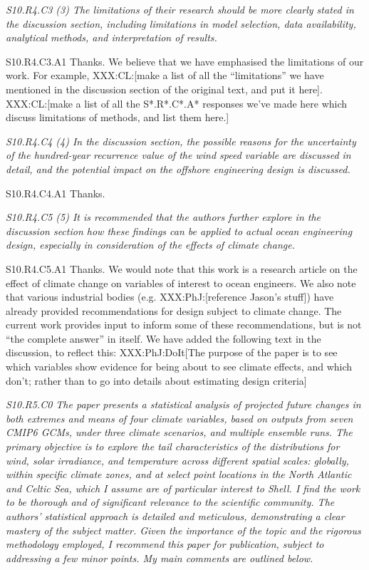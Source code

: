 \documentclass[a4paper,10pt]{article}
\begin{document}
	\emph{S10.R4.C3 (3) The limitations of their research should be more clearly stated in the discussion section, including limitations in model selection, data availability, analytical methods, and interpretation of results.}

	S10.R4.C3.A1 Thanks. We believe that we have emphasised the limitations of our work. For example, XXX:CL:[make a list of all the ``limitations'' we have mentioned in the discussion section of the original text, and put it here]. XXX:CL:[make a list of all the S*.R*.C*.A* responses we've made here which discuss limitations of methods, and list them here.]

	\emph{S10.R4.C4 (4) In the discussion section, the possible reasons for the uncertainty of the hundred-year recurrence value of the wind speed variable are discussed in detail, and the potential impact on the offshore engineering design is discussed.}

	S10.R4.C4.A1 Thanks.

	\emph{S10.R4.C5 (5) It is recommended that the authors further explore in the discussion section how these findings can be applied to actual ocean engineering design, especially in consideration of the effects of climate change.}

	S10.R4.C5.A1 Thanks. We would note that this work is a research article on the effect of climate change on variables of interest to ocean engineers. We also note that various industrial bodies (e.g. XXX:PhJ:[reference Jason's stuff]) have already provided recommendations for design subject to climate change. The current work provides input to inform some of these recommendations, but is not ``the complete answer'' in itself. We have added the following text in the discussion, to reflect this: XXX:PhJ:DoIt[The purpose of the paper is to see which variables show evidence for being about to see climate effects, and which don't; rather than to go into details about estimating design criteria]

	\emph{S10.R5.C0 The paper presents a statistical analysis of projected future changes in both extremes and means of four climate variables, based on outputs from seven CMIP6 GCMs, under three climate scenarios, and multiple ensemble runs. The primary objective is to explore the tail characteristics of the distributions for wind, solar irradiance, and temperature across different spatial scales: globally, within specific climate zones, and at select point locations in the North Atlantic and Celtic Sea, which I assume are of particular interest to Shell. I find the work to be thorough and of significant relevance to the scientific community. The authors' statistical approach is detailed and meticulous, demonstrating a clear mastery of the subject matter. Given the importance of the topic and the rigorous methodology employed, I recommend this paper for publication, subject to addressing a few minor points. My main comments are outlined below.}
\end{document}
